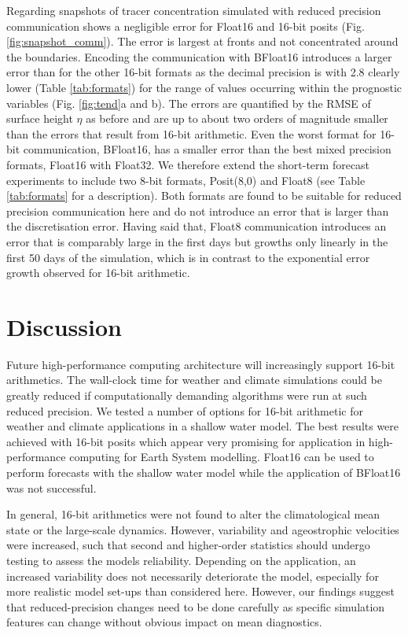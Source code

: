 Regarding snapshots of tracer concentration simulated with reduced precision communication shows a negligible error for Float16 and
16-bit posits (Fig. \ref{fig:snapshot_comm}). The error is largest at fronts and not concentrated around the boundaries. Encoding the
communication with BFloat16 introduces a larger error than for the other 16-bit formats as the decimal precision is with 2.8 clearly lower
(Table \ref{tab:formats}) for the range of values occurring within the prognostic variables (Fig. \ref{fig:tend}a and b). The errors are quantified
by the RMSE of surface height $\eta$ as before and are up to about two orders of magnitude smaller than the errors that result from 16-bit arithmetic.
Even the worst format for 16-bit communication, BFloat16, has a smaller error than the best mixed precision formats, Float16 with Float32.
We therefore extend the short-term forecast experiments to include two 8-bit formats, Posit(8,0) and Float8 (see Table \ref{tab:formats} for
a description). Both formats are found to be suitable for reduced precision communication here and do not introduce an error that is larger than the
discretisation error. Having said that, Float8 communication introduces an error that is comparably large in the first days but growths only
linearly in the first 50 days of the simulation, which is in contrast to the exponential error growth observed for 16-bit arithmetic.

\section{Discussion}
\label{sec:swm_discussion}

Future high-performance computing architecture will increasingly support 16-bit arithmetics. The wall-clock time for weather and climate
simulations could be greatly reduced if computationally demanding algorithms were run at such reduced precision. We tested a number
of options for 16-bit arithmetic for weather and climate applications in a shallow water model. The best results were achieved with 16-bit
posits which appear very promising for application in high-performance computing for Earth System modelling. Float16 can be used to
perform forecasts with the shallow water model while the application of BFloat16 was not successful.

In general, 16-bit arithmetics were not found to alter the climatological mean state or the large-scale dynamics. However, 
variability and ageostrophic velocities were increased, such that second and higher-order statistics should undergo testing
to assess the models reliability. Depending on the application, an increased variability does not  necessarily deteriorate the
model, especially for more realistic model set-ups than considered here. However, our findings suggest that reduced-precision
changes need to be done carefully as specific simulation features can change without obvious impact on mean diagnostics.

